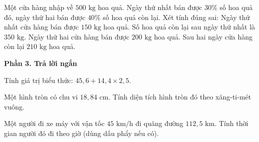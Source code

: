 \begin{ex} %
Một cửa hàng nhập về $500\text{ kg}$ hoa quả. Ngày thứ nhất bán được $30\%$ số hoa quả đó, ngày thứ hai bán được $40\%$ số hoa quả còn lại. Xét tính đúng sai:
\choiceTF
{\True Ngày thứ nhất cửa hàng bán được $150\text{ kg}$ hoa quả.}
{\True Số hoa quả còn lại sau ngày thứ nhất là $350\text{ kg}$.}
{Ngày thứ hai cửa hàng bán được $200\text{ kg}$ hoa quả.}
{\True Sau hai ngày cửa hàng còn lại $210\text{ kg}$ hoa quả.}
\end{ex}

\textbf{Phần 3. Trả lời ngắn}

\begin{ex} %
Tính giá trị biểu thức: $45{,}6 + 14{,}4 \times 2{,}5$.
\end{ex}

\begin{ex} %
Một hình tròn có chu vi $18{,}84\text{ cm}$. Tính diện tích hình tròn đó theo xăng-ti-mét vuông.
\end{ex}

\begin{ex} %
Một người đi xe máy với vận tốc $45\text{ km/h}$ đi quãng đường $112{,}5\text{ km}$. Tính thời gian người đó đi theo giờ (dùng dấu phẩy nếu có).
\end{ex}

